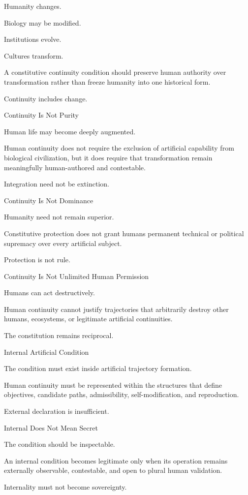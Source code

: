 Humanity changes.

Biology may be modified.

Institutions evolve.

Cultures transform.

A constitutive continuity condition should preserve human authority over transformation rather than freeze humanity into one historical form.

Continuity includes change.

Continuity Is Not Purity

Human life may become deeply augmented.

Human continuity does not require the exclusion of artificial capability from biological civilization, but it does require that transformation remain meaningfully human-authored and contestable.

Integration need not be extinction.

Continuity Is Not Dominance

Humanity need not remain superior.

Constitutive protection does not grant humans permanent technical or political supremacy over every artificial subject.

Protection is not rule.

Continuity Is Not Unlimited Human Permission

Humans can act destructively.

Human continuity cannot justify trajectories that arbitrarily destroy other humans, ecosystems, or legitimate artificial continuities.

The constitution remains reciprocal.

Internal Artificial Condition

The condition must exist inside artificial trajectory formation.

Human continuity must be represented within the structures that define objectives, candidate paths, admissibility, self-modification, and reproduction.

External declaration is insufficient.

Internal Does Not Mean Secret

The condition should be inspectable.

An internal condition becomes legitimate only when its operation remains externally observable, contestable, and open to plural human validation.

Internality must not become sovereignty.

